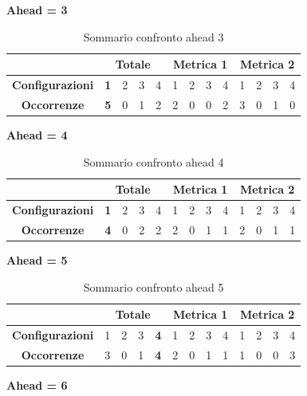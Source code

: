 \documentclass[12pt,a4paper,oneside,openright]{book}
\begin{document}
\medskip
\textbf{Ahead = 3}


\begin{table}[H]
\centering
\begin{tabular}{|c|c|c|c|c|c|c|c|c|c|c|c|c|}
\hline
 & \multicolumn{4}{|c|}{\textbf{Totale}} & \multicolumn{4}{|c|}{\textbf{Metrica 1}} & \multicolumn{4}{|c|}{\textbf{Metrica 2}} \\
\hline
\textbf{Configurazioni} & \textbf{1} & 2 & 3 & 4 & 1 & 2 & 3 & 4 & 1 & 2 & 3 & 4 \\
\hline
\textbf{Occorrenze} & \textbf{5} & 0 & 1 & 2 & 2 & 0 & 0 & 2 & 3 & 0 & 1 & 0\\
\hline
\end{tabular}
\caption{Sommario confronto ahead 3}
\end{table}

\medskip
\textbf{Ahead = 4}


\begin{table}[H]
\centering
\begin{tabular}{|c|c|c|c|c|c|c|c|c|c|c|c|c|}
\hline
 & \multicolumn{4}{|c|}{\textbf{Totale}} & \multicolumn{4}{|c|}{\textbf{Metrica 1}} & \multicolumn{4}{|c|}{\textbf{Metrica 2}} \\
\hline
\textbf{Configurazioni} & \textbf{1} & 2 & 3 & 4 & 1 & 2 & 3 & 4 & 1 & 2 & 3 & 4 \\
\hline
\textbf{Occorrenze} & \textbf{4} & 0 & 2 & 2 & 2 & 0 & 1 & 1 & 2 & 0 & 1 & 1\\
\hline
\end{tabular}
\caption{Sommario confronto ahead 4}
\end{table}

\medskip
\textbf{Ahead = 5}


\begin{table}[H]
\centering
\begin{tabular}{|c|c|c|c|c|c|c|c|c|c|c|c|c|}
\hline
 & \multicolumn{4}{|c|}{\textbf{Totale}} & \multicolumn{4}{|c|}{\textbf{Metrica 1}} & \multicolumn{4}{|c|}{\textbf{Metrica 2}} \\
\hline
\textbf{Configurazioni} & 1 & 2 & 3 & \textbf{4} & 1 & 2 & 3 & 4 & 1 & 2 & 3 & 4 \\
\hline
\textbf{Occorrenze} & 3 & 0 & 1 & \textbf{4} & 2 & 0 & 1 & 1 & 1 & 0 & 0 & 3\\
\hline
\end{tabular}
\caption{Sommario confronto ahead 5}
\end{table}

\newpage
\textbf{Ahead = 6}
\end{document}
